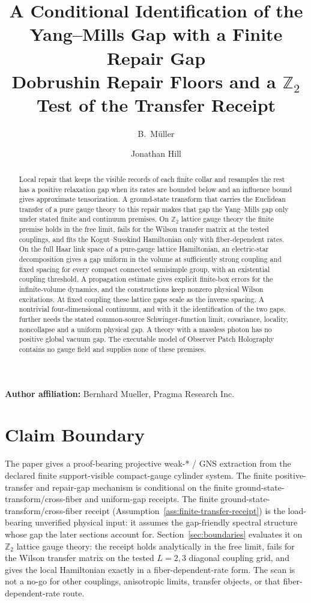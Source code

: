 \documentclass[11pt]{article}
\title{\textbf{A Conditional Identification of the Yang--Mills Gap with a Finite Repair Gap}\\
\large Dobrushin Repair Floors and a \(\mathbb Z_2\) Test of the Transfer Receipt}
\author{B.\ M\"uller \and Jonathan Hill}
\date{\OPHPaperReleaseDate}
\numberwithin{equation}{section}
\theoremstyle{remark}
\begin{document}
\maketitle
\OPHPaperReleaseBanner

\begin{center}
\small\textbf{Author affiliation:} Bernhard Mueller, Pragma Research Inc.
\end{center}

\begin{abstract}
Local repair that keeps the visible records of each finite collar and
resamples the rest has a positive relaxation gap when its rates are bounded
below and an influence bound gives approximate tensorization. A ground-state
transform that carries the Euclidean transfer of a pure gauge theory to this
repair makes that gap the Yang--Mills gap only under stated finite and
continuum premises. On \(\mathbb Z_2\) lattice gauge theory the finite
premise holds in the free limit, fails for the Wilson transfer matrix at the
tested couplings, and fits the Kogut--Susskind Hamiltonian only with
fiber-dependent rates. On the full Haar link space of a pure-gauge lattice
Hamiltonian, an electric-star decomposition gives a gap uniform in the volume
at sufficiently strong coupling and fixed spacing for every compact connected
semisimple group, with an existential coupling threshold. A propagation
estimate gives explicit finite-box
errors for the infinite-volume dynamics, and the constructions keep nonzero
physical Wilson excitations. At fixed coupling these lattice gaps scale as
the inverse spacing. A nontrivial four-dimensional continuum, and with it the
identification of the two gaps, further needs the stated common-source
Schwinger-function limit, covariance, locality, noncollapse and a uniform
physical gap. A theory with a massless photon has no positive global vacuum
gap. The executable model of Observer Patch
Holography contains no gauge field and supplies none of these premises.
\end{abstract}


\section{Claim Boundary}

The paper gives a proof-bearing projective weak-* / GNS extraction from the
declared finite support-visible compact-gauge cylinder system. The finite
positive-transfer and repair-gap mechanism is conditional on the finite
ground-state-transform/cross-fiber and uniform-gap receipts. The finite
ground-state-transform/cross-fiber receipt
(Assumption~\ref{ass:finite-transfer-receipt}) is the load-bearing
unverified physical input: it assumes the gap-friendly spectral structure
whose gap the later sections account for. Section~\ref{sec:boundaries}
evaluates it on \(\mathbb Z_2\) lattice gauge theory: the receipt holds
analytically in the free limit, fails for the Wilson transfer matrix on the
tested \(L=2,3\) diagonal coupling grid, and gives the local Hamiltonian
exactly in a fiber-dependent-rate form. The scan is not a no-go for other
couplings, anisotropic limits, transfer objects, or that
fiber-dependent-rate route.
\end{document}
